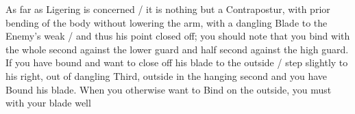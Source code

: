 As far as Ligering is concerned / it is nothing but a Contrapostur,
with prior bending of the body without
lowering the arm, with a dangling Blade to the Enemy's weak / and thus his point
closed off; you should note that you bind with the whole second
against the lower guard and half second against the high guard. If you
have bound and want to close off his blade to the outside / step
slightly to his right, out of dangling Third, outside in the hanging
second and you have Bound his blade. When you otherwise want to
Bind on the outside, you must with your blade well
